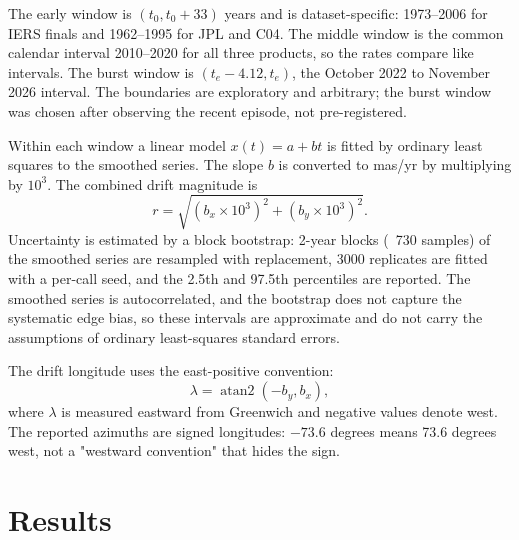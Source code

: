 \documentclass[11pt,a4paper]{article}
\begin{document}
The early window is $(t_0, t_0+33)$ years and is dataset-specific: 1973--2006 for IERS finals and 1962--1995 for JPL and C04. The middle window is the common calendar interval 2010--2020 for all three products, so the rates compare like intervals. The burst window is $(t_e-4.12, t_e)$, the October 2022 to November 2026 interval. The boundaries are exploratory and arbitrary; the burst window was chosen after observing the recent episode, not pre-registered.

Within each window a linear model $x(t) = a + bt$ is fitted by ordinary least squares to the smoothed series. The slope $b$ is converted to mas/yr by multiplying by $10^3$. The combined drift magnitude is
\begin{equation}
r = \sqrt{(b_x \times 10^3)^2 + (b_y \times 10^3)^2}.
\end{equation}
Uncertainty is estimated by a block bootstrap: 2-year blocks (~730 samples) of the smoothed series are resampled with replacement, 3000 replicates are fitted with a per-call seed, and the 2.5th and 97.5th percentiles are reported. The smoothed series is autocorrelated, and the bootstrap does not capture the systematic edge bias, so these intervals are approximate and do not carry the assumptions of ordinary least-squares standard errors.

The drift longitude uses the east-positive convention:
\begin{equation}
\lambda = \operatorname{atan2}(-b_y, b_x),
\end{equation}
where $\lambda$ is measured eastward from Greenwich and negative values denote west. The reported azimuths are signed longitudes: $-73.6$ degrees means 73.6 degrees west, not a "westward convention" that hides the sign.

\section{Results}
\end{document}
